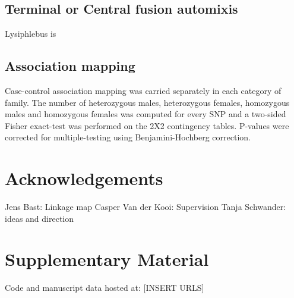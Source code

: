 \documentclass[11pt,a4paper]{report}
\begin{document}
\subsection*{Terminal or Central fusion automixis}
Lysiphlebus is 

\subsection*{Association mapping}
Case-control association mapping was carried separately in each category of family. The number of heterozygous males, heterozygous females, homozygous males and homozygous females was computed for every SNP and a two-sided Fisher exact-test was performed on the 2X2 contingency tables. P-values were corrected for multiple-testing using Benjamini-Hochberg correction. 

\section*{Acknowledgements}
Jens Bast: Linkage map
Casper Van der Kooi: Supervision
Tanja Schwander: ideas and direction
\section*{Supplementary Material}

Code and manuscript data hosted at: [INSERT URLS]


\fancyhead[L]{\slshape }

\end{document}
